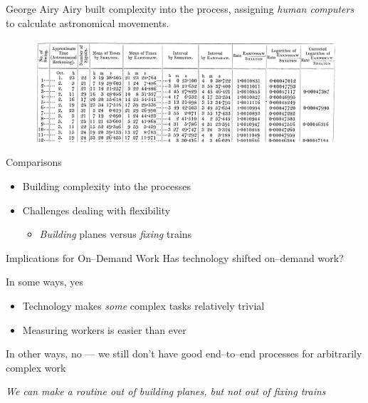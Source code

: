 \documentclass[presentation]{subfiles}
\begin{document}
\begin{frame}{George Airy}
    Airy built complexity into the process, assigning \emph{human computers} 
    to calculate astronomical movements.

    \begin{figure}
    \includegraphics[width=\textwidth]{../../../presentations/common_figures/complexity/pw_literature/airy.png}
    \end{figure}
\end{frame}






\begin{frame}{Comparisons}

\begin{itemize}
    \item<+-> Building complexity into the processes
  \item Challenges dealing with flexibility
  \begin{itemize}
    \item \emph{Building} planes versus \emph{fixing} trains
  \end{itemize}
\end{itemize}
\end{frame}

\begin{frame}{Implications for On--Demand Work}
  Has technology shifted on--demand work?
    
  In some ways, yes
        \begin{itemize}
          \item Technology makes \emph{some} complex tasks relatively trivial
          \item Measuring workers is easier than ever
        \end{itemize}
  In other ways, no --- we still don't have good end--to--end processes for arbitrarily complex work

  \emph{We can make a routine out of building planes, but not out of fixing trains}
\end{frame}
\end{document}
